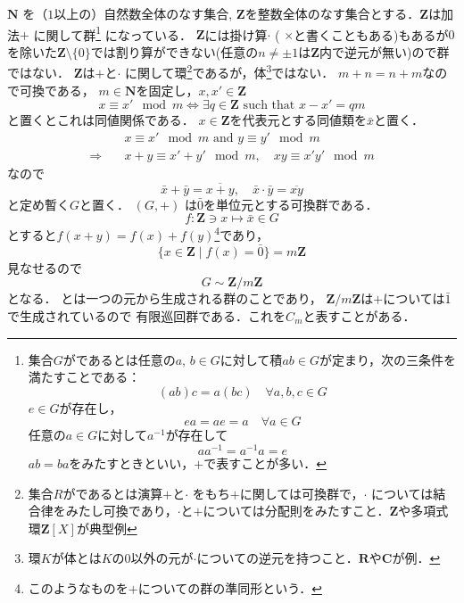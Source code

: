 $\mathbf N$ を（$1$以上の）自然数全体のなす集合, $\mathbf Z$を整数全体のなす集合とする．$\mathbf Z$は加法$+$
に関して群\footnote{集合$G$がであるとは任意の$a$, $b\in G$に対して積$ab\in G$が定まり，次の三条件を満たすことである：
\[
   (ab)c = a(bc)\quad \forall a, b, c\in G
\]
$e\in G$が存在し，
\[
   ea=ae=a\quad \forall a\in G
\]
任意の$a\in G$に対して$a^{-1}$が存在して
\[
   aa^{-1}= a^{-1}a = e
\]
$ab=ba$をみたすときといい，$+$で表すことが多い．}
になっている．
$\mathbf Z$には掛け算$\cdot$ ( $\times$と書くこともある)もあるが$0$を除いた$\mathbf Z\setminus\{0\}$では割り算ができない(任意の$n\neq\pm1$は$\mathbf Z$内で逆元が無い)ので群ではない．
$\mathbf Z$は$+$と$\cdot$ に関して環\footnote{集合$R$がであるとは演算$+$と$\cdot$ をもち$+$に関しては可換群で，$\cdot$ については結合律をみたし可換であり，$\cdot$と$+$については分配則をみたすこと．$\mathbf Z$や多項式環$\mathbf Z[X]$が典型例}であるが，体\footnote{環$K$が体とは$K$の$0$以外の元が$\cdot$についての逆元を持つこと．$\mathbf R$や$\mathbf C$が例．}ではない．
$m+n=n+m$なので可換である，%
$m\in \mathbf N$を固定し，$x, x'\in \mathbf Z $
\[
   x\equiv x' \mod m \Leftrightarrow 
   \exists q \in  \mathbf Z \text{ such that }x-x'=qm
\]
と置くとこれは同値関係である．
$x\in \mathbf Z $を代表元とする同値類を$\bar x$と置く．
\[
\begin{split}
   &x\equiv x' \mod m  \text{ and } y\equiv y' \mod m\\
   \Rightarrow \quad
   & x + y \equiv x' + y' \mod m,\quad
   xy\equiv x'y' \mod m
\end{split}
\]
なので
\[
   \bar x + \bar y = \overline{x+y},\quad
   \bar x\cdot \bar y = \overline{xy}
\]
と定め暫く$G$と置く．
$(G, +)$ は$\bar 0$を単位元とする可換群である．
\[
   f:\mathbf Z \ni x \mapsto \bar x \in G
\]
とすると$f(x+y)=f(x)+f(y)$\footnote{このようなものを$+$についての群の準同形という．}であり，
\[
   \{x\in \mathbf Z\mid  f(x)=\bar 0\}= m\mathbf Z
\]
見なせるので
\[
   G \sim \mathbf Z/m\mathbf Z
\]
となる．
とは一つの元から生成される群のことであり，
$\mathbf Z/m\mathbf Z$は$+$については$\bar 1$で生成されているので
有限巡回群である．これを$C_m$と表すことがある．
\emptyline

